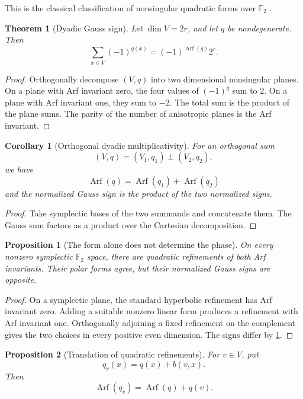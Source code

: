 \documentclass[11pt]{amsart}
\newtheorem{theorem}{Theorem}[section]
\newtheorem{proposition}[proposition]{Proposition}
\newtheorem{corollary}[corollary]{Corollary}
\theoremstyle{definition}
\theoremstyle{remark}
\newcommand{\FF}{\mathbb F}
\newcommand{\Arf}{\operatorname{Arf}}
\newcommand{\perpbig}{\mathop{\perp}\limits}
\begin{document}
This is the classical classification of nonsingular quadratic forms over \(\FF_2\) \cite{MilnorHusemoller1973}.

\begin{theorem}[Dyadic Gauss sign]\label{thm:arf_gauss}
Let \(\dim V=2r\), and let \(q\) be nondegenerate. Then
\[
\boxed{
\sum_{x\in V}(-1)^{q(x)}
=
(-1)^{\Arf(q)}2^r.
}
\]
\end{theorem}

\begin{proof}
Orthogonally decompose \((V,q)\) into two dimensional nonsingular planes. On a plane with Arf invariant zero, the four values of \((-1)^q\) sum to \(2\). On a plane with Arf invariant one, they sum to \(-2\). The total sum is the product of the plane sums. The parity of the number of anisotropic planes is the Arf invariant.
\end{proof}

\begin{corollary}[Orthogonal dyadic multiplicativity]\label{cor:arf_multiplicative}
For an orthogonal sum
\[
(V,q)=(V_1,q_1)\perpbig(V_2,q_2),
\]
we have
\[
\Arf(q)=\Arf(q_1)+\Arf(q_2)
\]
and the normalized Gauss sign is the product of the two normalized signs.
\end{corollary}

\begin{proof}
Take symplectic bases of the two summands and concatenate them. The Gauss sum factors as a product over the Cartesian decomposition.
\end{proof}

\begin{proposition}[The form alone does not determine the phase]\label{prop:dyadic_need_q}
On every nonzero symplectic \(\FF_2\) space, there are quadratic refinements of both Arf invariants. Their polar forms agree, but their normalized Gauss signs are opposite.
\end{proposition}

\begin{proof}
On a symplectic plane, the standard hyperbolic refinement has Arf invariant zero. Adding a suitable nonzero linear form produces a refinement with Arf invariant one. Orthogonally adjoining a fixed refinement on the complement gives the two choices in every positive even dimension. The signs differ by \cref{thm:arf_gauss}.
\end{proof}


\begin{proposition}[Translation of quadratic refinements]\label{prop:quadratic_translation}
For \(v\in V\), put
\[
q_v(x)=q(x)+b(v,x).
\]
Then
\[
\boxed{
\Arf(q_v)=\Arf(q)+q(v).
}
\]
\end{proposition}
\end{document}
